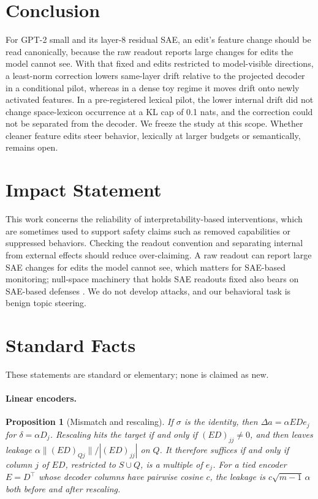 \documentclass{article}
\theoremstyle{plain}
\newtheorem{proposition}[theorem]{Proposition}
\theoremstyle{definition}
\theoremstyle{remark}
\begin{document}
\section{Conclusion}
\label{sec:conclusion}
For GPT-2 small and its layer-8 residual SAE, an edit's feature change should be read
canonically, because the raw readout reports large changes for edits the model cannot see.
With that fixed and edits restricted to model-visible directions, a least-norm correction
lowers same-layer drift relative to the projected decoder in a conditional pilot, whereas in
a dense toy regime it moves drift onto newly activated features. In a pre-registered lexical
pilot, the lower internal drift did not change space-lexicon occurrence at a KL cap of 0.1
nats, and the correction could not be separated from the decoder. We freeze the study at
this scope. Whether cleaner feature edits steer behavior, lexically at larger budgets or
semantically, remains open.

\section*{Impact Statement}
This work concerns the reliability of interpretability-based interventions, which are
sometimes used to support safety claims such as removed capabilities or suppressed
behaviors. Checking the readout convention and separating internal from external effects
should reduce over-claiming. A raw readout can report large SAE changes for edits the model
cannot see, which matters for SAE-based monitoring; null-space machinery that holds SAE
readouts fixed also bears on SAE-based defenses \citep{cui2026sae}. We do not develop
attacks, and our behavioral task is benign topic steering.




\newpage
\appendix
\onecolumn

\section{Standard Facts}
\label{app:facts}
These statements are standard or elementary; none is claimed as new.

\paragraph{Linear encoders.}
\begin{proposition}[Mismatch and rescaling]
\label{prop:mismatch}
If $\sigma$ is the identity, then $\Delta a = \alpha EDe_j$ for $\delta = \alpha D_j$.
Rescaling hits the target if and only if $(ED)_{jj}\neq 0$, and then leaves leakage
$\alpha\|(ED)_{Qj}\|/|(ED)_{jj}|$ on $Q$. It therefore suffices if and only if column $j$ of
$ED$, restricted to $S\cup Q$, is a multiple of $e_j$. For a tied encoder $E = D^{\top}$
whose decoder columns have pairwise cosine $c$, the leakage is $c\sqrt{m-1}\,\alpha$ both
before and after rescaling.
\end{proposition}
\end{document}
